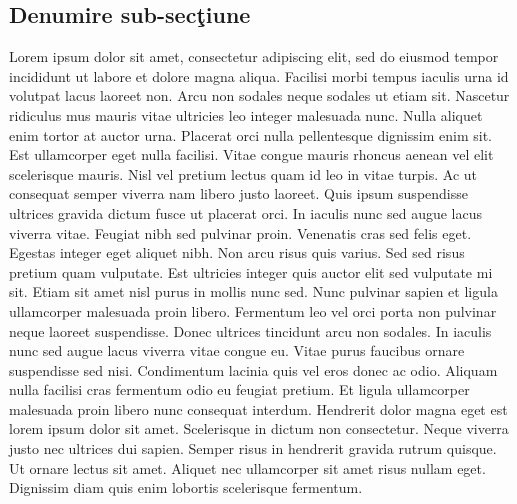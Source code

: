 \subsection{Denumire sub-sec\c{t}iune}
Lorem ipsum dolor sit amet, consectetur adipiscing elit, sed do eiusmod tempor incididunt ut labore et dolore magna aliqua. Facilisi morbi tempus iaculis urna id volutpat lacus laoreet non. Arcu non sodales neque sodales ut etiam sit. Nascetur ridiculus mus mauris vitae ultricies leo integer malesuada nunc. Nulla aliquet enim tortor at auctor urna. Placerat orci nulla pellentesque dignissim enim sit. Est ullamcorper eget nulla facilisi. Vitae congue mauris rhoncus aenean vel elit scelerisque mauris. Nisl vel pretium lectus quam id leo in vitae turpis. Ac ut consequat semper viverra nam libero justo laoreet. Quis ipsum suspendisse ultrices gravida dictum fusce ut placerat orci. In iaculis nunc sed augue lacus viverra vitae. Feugiat nibh sed pulvinar proin. Venenatis cras sed felis eget. Egestas integer eget aliquet nibh. Non arcu risus quis varius. Sed sed risus pretium quam vulputate.
Est ultricies integer quis auctor elit sed vulputate mi sit. Etiam sit amet nisl purus in mollis nunc sed. Nunc pulvinar sapien et ligula ullamcorper malesuada proin libero. Fermentum leo vel orci porta non pulvinar neque laoreet suspendisse. Donec ultrices tincidunt arcu non sodales. In iaculis nunc sed augue lacus viverra vitae congue eu. Vitae purus faucibus ornare suspendisse sed nisi. Condimentum lacinia quis vel eros donec ac odio. Aliquam nulla facilisi cras fermentum odio eu feugiat pretium. Et ligula ullamcorper malesuada proin libero nunc consequat interdum. Hendrerit dolor magna eget est lorem ipsum dolor sit amet. Scelerisque in dictum non consectetur. Neque viverra justo nec ultrices dui sapien. Semper risus in hendrerit gravida rutrum quisque. Ut ornare lectus sit amet. Aliquet nec ullamcorper sit amet risus nullam eget. Dignissim diam quis enim lobortis scelerisque fermentum.